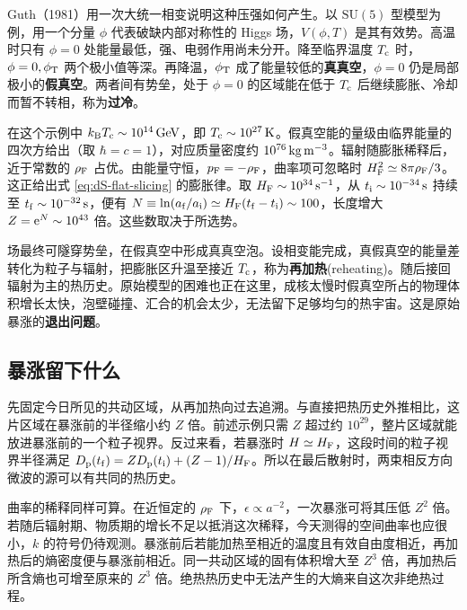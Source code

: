 Guth（1981）用一次大统一相变说明这种压强如何产生。以 $\mathrm{SU}(5)$ 型模型为例，用一个分量 $\phi$ 代表破缺内部对称性的 Higgs 场，$V(\phi,T)$ 是其有效势。高温时只有 $\phi=0$ 处能量最低，强、电弱作用尚未分开。降至临界温度 $T_{\rm c}$ 时，$\phi=0,\phi_{\rm T}$ 两个极小值等深。再降温，$\phi_{\rm T}$ 成了能量较低的\textbf{真真空}，$\phi=0$ 仍是局部极小的\textbf{假真空}。两者间有势垒，处于 $\phi=0$ 的区域能在低于 $T_{\rm c}$ 后继续膨胀、冷却而暂不转相，称为\textbf{过冷}。

在这个示例中 $k_{\rm B}T_{\rm c}\sim10^{14}\,{\rm GeV}$，即 $T_{\rm c}\sim10^{27}\,{\rm K}$。假真空能的量级由临界能量的四次方给出（取 $\hbar=c=1$），对应质量密度约 $10^{76}\,{\rm kg\,m^{-3}}$。辐射随膨胀稀释后，近于常数的 $\rho_{\rm F}$ 占优。由能量守恒，$p_{\rm F}=-\rho_{\rm F}$，曲率项可忽略时 $H_{\rm F}^2\simeq8\pi\rho_{\rm F}/3$。这正给出式 \eqref{eq:dS-flat-slicing} 的膨胀律。取 $H_{\rm F}\sim10^{34}\,{\rm s}^{-1}$，从 $t_{\rm i}\sim10^{-34}\,{\rm s}$ 持续至 $t_{\rm f}\sim10^{-32}\,{\rm s}$，便有 $N\equiv\ln(a_{\rm f}/a_{\rm i})\simeq H_{\rm F}(t_{\rm f}-t_{\rm i})\sim100$，长度增大 $Z=\mathrm{e}^N\sim10^{43}$ 倍。这些数取决于所选势。

场最终可隧穿势垒，在假真空中形成真真空泡。设相变能完成，真假真空的能量差转化为粒子与辐射，把膨胀区升温至接近 $T_{\rm c}$，称为\textbf{再加热}(reheating)。随后接回辐射为主的热历史。原始模型的困难也正在这里，成核太慢时假真空所占的物理体积增长太快，泡壁碰撞、汇合的机会太少，无法留下足够均匀的热宇宙。这是原始暴涨的\textbf{退出问题}。

\subsection{暴涨留下什么}

先固定今日所见的共动区域，从再加热向过去追溯。与直接把热历史外推相比，这片区域在暴涨前的半径缩小约 $Z$ 倍。前述示例只需 $Z$ 超过约 $10^{29}$，整片区域就能放进暴涨前的一个粒子视界。反过来看，若暴涨时 $H\simeq H_{\rm F}$，这段时间的粒子视界半径满足 $D_{\rm p}(t_{\rm f})=Z D_{\rm p}(t_{\rm i})+(Z-1)/H_{\rm F}$。所以在最后散射时，两束相反方向微波的源可以有共同的热历史。

曲率的稀释同样可算。在近恒定的 $\rho_{\rm F}$ 下，$\epsilon\propto a^{-2}$，一次暴涨可将其压低 $Z^2$ 倍。若随后辐射期、物质期的增长不足以抵消这次稀释，今天测得的空间曲率也应很小，$k$ 的符号仍待观测。暴涨前后若能加热至相近的温度且有效自由度相近，再加热后的熵密度便与暴涨前相近。同一共动区域的固有体积增大至 $Z^3$ 倍，再加热后所含熵也可增至原来的 $Z^3$ 倍。绝热热历史中无法产生的大熵来自这次非绝热过程。

